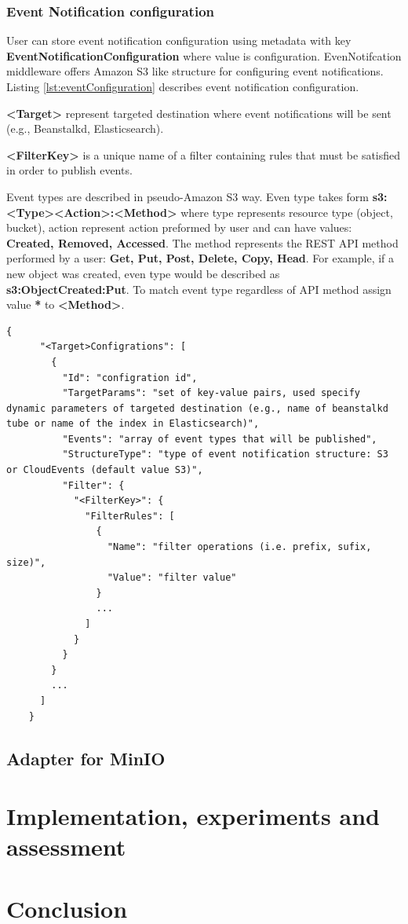     \subsection{Event Notification configuration}
    User can store event notification configuration using metadata with key \textbf{EventNotificationConfiguration} where value is configuration.
    EvenNotifcation middleware offers Amazon S3 like structure for configuring event notifications.
    Listing \ref{lst:eventConfiguration} describes event notification configuration.

    \textbf{<Target>} represent targeted destination where event notifications will be sent (e.g., Beanstalkd, Elasticsearch).

    \textbf{<FilterKey>} is a unique name of a filter containing rules that must be satisfied in order to publish events.

    Event types are described in pseudo-Amazon S3 way. Even type takes form \textbf{s3:<Type><Action>:<Method>} where type represents resource type (object, bucket), action represent action preformed by user and can have values: \textbf{Created, Removed, Accessed}. The method represents the REST API method performed by a user: \textbf{Get, Put, Post, Delete, Copy, Head}. For example, if a new object was created, even type would be described as \textbf{s3:ObjectCreated:Put}. To match event type regardless of API method assign value \textbf{*} to \textbf{<Method>}.

    \begin{lstlisting}[style=jsonStyle, caption=Strucute of event notification configuration,    label=lst:eventConfiguration]
    {
      "<Target>Configrations": [
        {
          "Id": "configration id",
          "TargetParams": "set of key-value pairs, used specify dynamic parameters of targeted destination (e.g., name of beanstalkd tube or name of the index in Elasticsearch)",
          "Events": "array of event types that will be published",
          "StructureType": "type of event notification structure: S3 or CloudEvents (default value S3)",
          "Filter": {
            "<FilterKey>": {
              "FilterRules": [
                {
                  "Name": "filter operations (i.e. prefix, sufix, size)",
                  "Value": "filter value"
                }
                ...
              ]
            }
          }
        }
        ...
      ]
    }
    \end{lstlisting}


\section{Adapter for MinIO}
\chapter{Implementation, experiments and assessment}

\chapter{Conclusion}

